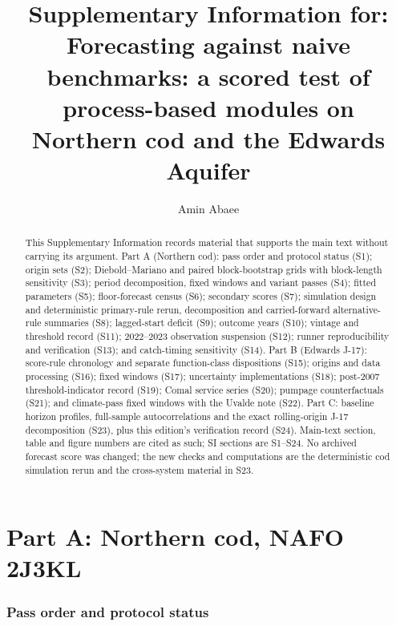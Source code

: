 \documentclass[preprint,11pt,authoryear]{elsarticle}
\theoremstyle{remark}
\begin{document}
\begin{frontmatter}
\title{Supplementary Information for:\\ Forecasting against naive benchmarks: a scored test of process-based modules on Northern cod and the Edwards Aquifer}
\author[1]{Amin Abaee}
\begin{abstract}
This Supplementary Information records material that supports the main text without carrying its argument. Part A (Northern cod): pass order and protocol status (S1); origin sets (S2); Diebold--Mariano and paired block-bootstrap grids with block-length sensitivity (S3); period decomposition, fixed windows and variant passes (S4); fitted parameters (S5); floor-forecast census (S6); secondary scores (S7); simulation design and deterministic primary-rule rerun, decomposition and carried-forward alternative-rule summaries (S8); lagged-start deficit (S9); outcome years (S10); vintage and threshold record (S11); 2022--2023 observation suspension (S12); runner reproducibility and verification (S13); and catch-timing sensitivity (S14). Part B (Edwards J-17): score-rule chronology and separate function-class dispositions (S15); origins and data processing (S16); fixed windows (S17); uncertainty implementations (S18); post-2007 threshold-indicator record (S19); Comal service series (S20); pumpage counterfactuals (S21); and climate-pass fixed windows with the Uvalde note (S22). Part C: baseline horizon profiles, full-sample autocorrelations and the exact rolling-origin J-17 decomposition (S23), plus this edition's verification record (S24). Main-text section, table and figure numbers are cited as such; SI sections are S1--S24. No archived forecast score was changed; the new checks and computations are the deterministic cod simulation rerun and the cross-system material in S23.
\end{abstract}
\end{frontmatter}

\part*{Part A: Northern cod, NAFO 2J3KL}

\section{Pass order and protocol status}\label{si:passes}
\end{document}
